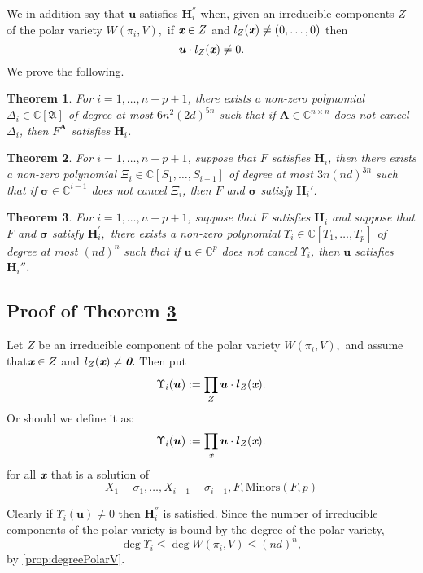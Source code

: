 \documentclass[a4paper]{article}
\def\A{\mathfrak{A}}
\def\bz{\textit{\textbf{0}}}
\def\mA{{\bm A}}
\def\ub{{\bm u}}
\def\lb{{\bm l}}
\def\xb{\textit{\textbf{x}}}
\def\D{\Delta}
\def\minors{\textrm{Minors}(F,p)}
\def\C{\mathbb{C}}
\newtheorem{theorem}{Theorem}[section]
\begin{document}
\noindent 
We in addition say that $\bm u$ satisfies $\textbf{H}_i^{''}$ when, given an irreducible components $Z$ of the polar variety $W(\pi_i,V),$ if $\xb \in Z$ and $l_Z(\xb) \not = (0,\hdots,0)$ then 
\[
\ub \cdot l_Z(\xb) \not = 0.
\]
\noindent 
We prove the following.  
%
\begin{theorem}\label{theo:NoetherPositionG}
  For $i=1,\dots,n-p+1$, there exists a non-zero polynomial $\D_i\in\C[\A]$ of degree at most $6n^2(2d)^{5n}$ such that if $\mA \in
  \C^{n\times n}$ does not cancel $\D_i$, then
  $F^\mA$ satisfies $\textbf{H}_i$.
\end{theorem}
%
\begin{theorem}\label{theo:sigmaG}
  For $i=1,\dots,n-p+1$, suppose that $F$ satisfies $\textbf{H}_i$, then there exists a non-zero
  polynomial $\Xi_{i} \in \C[S_1,\dots,S_{i-1}]$ of degree at most
  $3n(nd)^{3n}$ such that if $\bm \sigma \in \C^{i-1}$ does not
  cancel $\Xi_{i}$, then $F$ and $\bm \sigma$ satisfy $\textbf{H}_i'$.
\end{theorem}
%
\begin{theorem}\label{the:u}
  For $i=1,\dots,n-p+1$, suppose that $F$ satisfies $\textbf{H}_i$ and suppose that $F$ and $\bm \sigma$ satisfy $\textbf{H}_i^{'},$ there exists a non-zero
  polynomial $\Upsilon_{i} \in \C[T_1,\dots,T_{p}]$ of degree at most $(nd)^{n}$ such that if $\bm u \in \C^{p}$ does not
  cancel $\Upsilon_{i}$, then $\bm u$ satisfies $\textbf{H}_i{''}$.
\end{theorem}
%

\subsection{Proof of Theorem \ref{the:u}}
Let $Z$ be an irreducible component of the polar variety $W(\pi_i,V),$ and assume that$\xb \in Z$ and $l_Z(\xb) \not = \bz.$ Then put
\[
\Upsilon_i(\ub) := \prod_{Z} \ub \cdot \lb_Z(\xb).
\]
Or should we define it as:
\[
\Upsilon_i(\ub) := \prod_{\xb} \ub \cdot \lb_Z(\xb).
\]
for all $\xb$ that is a solution of 
\begin{equation}\label{sys:minors}
X_1 - \sigma_1,\hdots,X_{i-1} - \sigma_{i-1}, F, \minors  
\end{equation}


Clearly if $\Upsilon_i(\ub) \not = 0$ then $\bm H_i^{''}$ is satisfied. Since the number of irreducible components of the polar variety is bound by the degree of the polar variety,
\[
\deg \Upsilon_i \leq \deg W(\pi_i,V) \leq (nd)^{n},
\]
by \ref{prop:degreePolarV}.
\end{document}
